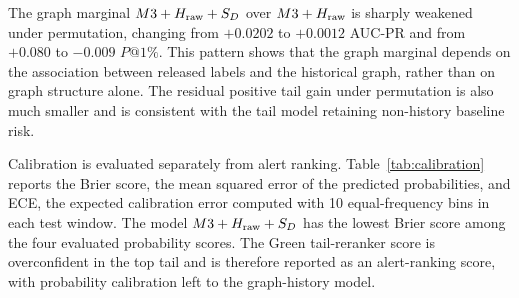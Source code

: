 \documentclass[11pt]{article}
\theoremstyle{definition}
\theoremstyle{remark}
\begin{document}
\begin{table}[h]
\centering
\caption{Permutation placebo. Real gains use true released-history labels; placebo gains permute released-history labels while keeping graph structure and evaluation labels fixed.}
\label{tab:placebo}
\end{table}

The graph marginal $M3+H_{\rm raw}+S_D$ over $M3+H_{\rm raw}$ is sharply weakened under permutation, changing from $+0.0202$ to $+0.0012$ AUC-PR and from $+0.080$ to $-0.009$ $P@1\%$. This pattern shows that the graph marginal depends on the association between released labels and the historical graph, rather than on graph structure alone. The residual positive tail gain under permutation is also much smaller and is consistent with the tail model retaining non-history baseline risk.

Calibration is evaluated separately from alert ranking. Table~\ref{tab:calibration} reports the Brier score, the mean squared error of the predicted probabilities, and ECE, the expected calibration error computed with 10 equal-frequency bins in each test window. The model $M3+H_{\rm raw}+S_D$ has the lowest Brier score among the four evaluated probability scores. The Green tail-reranker score is overconfident in the top tail and is therefore reported as an alert-ranking score, with probability calibration left to the graph-history model.
\end{document}
